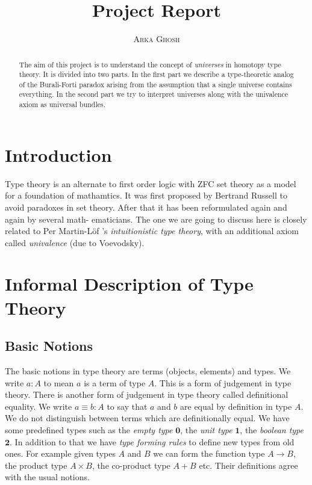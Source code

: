 \documentclass[10pt]{article}
\title{\bf{Project Report}}
\author{\textsc{Arka Ghosh}}
\theoremstyle{definition}
\theoremstyle{plain}
\theoremstyle{remark}
\begin{document}
\begin{titlepage}

\maketitle

\tableofcontents

\begin{abstract}
The aim of this project is to understand the concept of \emph{universes} in homotopy type 
theory. It is divided into two parts. In the first part we describe a type-theoretic 
analog of the Burali-Forti paradox arising from the assumption that a single universe contains 
everything. In the second part we try to interpret universes along with the univalence axiom 
as universal bundles.
\end{abstract}

\end{titlepage}


\section{Introduction}\label{Intro}
Type theory is an alternate to first order logic with ZFC set theory as a model for a 
foundation of mathamtics. It was first proposed by Bertrand Russell to avoid paradoxes in 
set theory. After that it has been reformulated again and again by several math-
ematicians. The one we are going to discuss here is closely related to Per Martin-L\"of 's \emph{intuitionistic type theory}, with an additional axiom called \emph{univalence} (due to
Voevodsky).


\section{Informal Description of Type Theory}

\subsection{Basic Notions}

The basic notions in type theory are terms (objects, elements) and types.  We write 
$a : A$ to mean $a$ is a term of type $A$. This is a form of judgement in type theory.
There is another form of judgement in type theory called definitional equality. We write
$a \equiv b : A$ to say that $a$ and $b$ are equal by definition in type $A$. We do not
distinguish between terms which are definitionally equal. We have some predefined types such 
as the \emph{empty type} $\mathbf{0}$, the \emph{unit type} $\mathbf{1}$, 
the \emph{boolean type} $\mathbf{2}$. In addition to that we have \emph{type forming rules} 
to define new types from old ones. For example given types $A$ and $B$ we can form the 
function type $A \to B$, the product type $A \times B$, the co-product type $A + B$ etc. 
Their definitions agree with the usual notions.\smallskip
\end{document}
